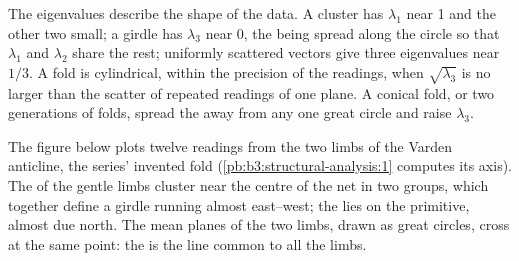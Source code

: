 The eigenvalues describe the shape of the data. A cluster has $\lambda_1$ near
1 and the other two small; a girdle has $\lambda_3$ near 0, the  being
spread along the circle so that $\lambda_1$ and $\lambda_2$ share the rest;
uniformly scattered vectors give three eigenvalues near $1/3$. A fold is
cylindrical, within the precision of the readings, when $\sqrt{\lambda_3}$ is
no larger than the scatter of repeated readings of one plane. A conical fold,
or two generations of folds, spread the  away from any one great circle
and raise $\lambda_3$.

The figure below plots twelve readings from the two limbs of the Varden
anticline, the series' invented fold (\cref{pb:b3:structural-analysis:1}
computes its axis). The  of the gentle limbs cluster near the centre of
the net in two groups, which together define a girdle running almost
east--west; the  lies on the primitive, almost due north. The mean
planes of the two limbs, drawn as great circles, cross at the same point:
the  is the line common to all the limbs.

